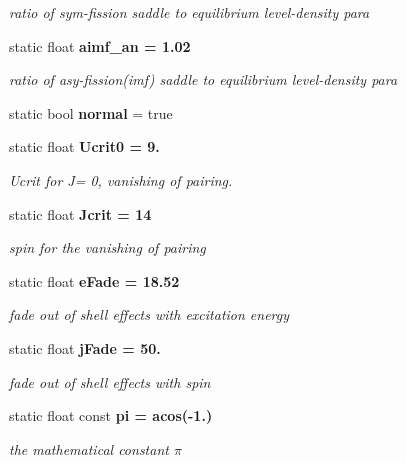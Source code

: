\begin{CompactItemize}
\begin{CompactList}\small\item\em ratio of sym-fission saddle to equilibrium level-density para \item\end{CompactList}\item 
static float \bf{aimf\_\-an} = 1.02\label{classCLevelDensity_18087f4cc08ed484bc2be0757dd56bf5}

\begin{CompactList}\small\item\em ratio of asy-fission(imf) saddle to equilibrium level-density para \item\end{CompactList}\item 
static bool \textbf{normal} = true\label{classCLevelDensity_30347a681f59c2634e83b10c01433bad}

\item 
static float \bf{Ucrit0} = 9.\label{classCLevelDensity_4c1ae144f6bd88d08984c68545417e05}

\begin{CompactList}\small\item\em Ucrit for J= 0, vanishing of pairing. \item\end{CompactList}\item 
static float \bf{Jcrit} = 14\label{classCLevelDensity_997a519ce7eeafe12d42b89a712b361a}

\begin{CompactList}\small\item\em spin for the vanishing of pairing \item\end{CompactList}\item 
static float \bf{e\-Fade} = 18.52\label{classCLevelDensity_cc813690a415d62c977ee7d6d9125f90}

\begin{CompactList}\small\item\em fade out of shell effects with excitation energy \item\end{CompactList}\item 
static float \bf{j\-Fade} = 50.\label{classCLevelDensity_9b2cb43c005e88d8fbedd5853e9960e5}

\begin{CompactList}\small\item\em fade out of shell effects with spin \item\end{CompactList}\item 
static float const \bf{pi} = acos(-1.)\label{classCLevelDensity_2a8c4bc82f1676360d9a68e33ab82067}

\begin{CompactList}\small\item\em the mathematical constant $\pi$ \item\end{CompactList}\end{CompactItemize}


